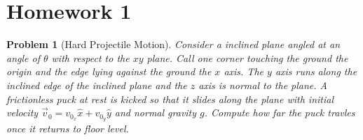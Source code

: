 \documentclass{article}
\theoremstyle{norm}
\newtheorem{prb}[thm]{Problem}
\begin{document}
\section{Homework 1}

\begin{prb}[Hard Projectile Motion]
Consider a inclined plane angled at an angle of $\theta$ with respect to
the $xy$ plane. Call one corner touching the ground the origin and the
edge lying against the ground the $x$ axis. The $y$ axis runs along the
inclined edge of the inclined plane and the $z$ axis is normal to the
plane. A frictionless puck at rest is kicked so that it slides along the
plane with initial velocity $\vec{v}_0 = v_{0_x} \hat{x} + v_{0_y}
\hat{y}$ and normal gravity $g$. Compute how far the puck travles once
it returns to floor level.
\end{prb}
\end{document}
